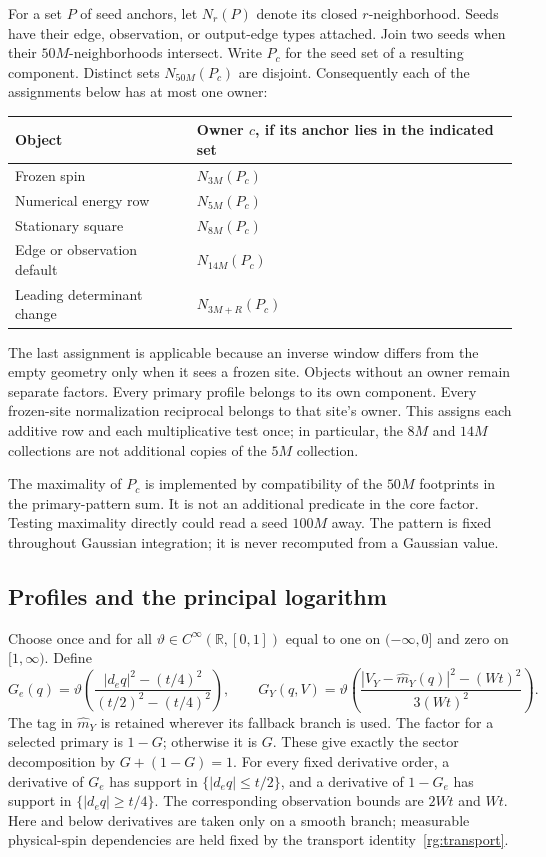 For a set $P$ of seed anchors, let $N_r(P)$ denote its closed
$r$-neighborhood.  Seeds have their edge, observation, or output-edge
types attached.  Join two seeds when their $50M$-neighborhoods intersect.
Write $P_c$ for the seed set of a resulting component.  Distinct sets
$N_{50M}(P_c)$ are disjoint.  Consequently each of the assignments below
has at most one owner:
\begin{center}
\begin{tabular}{ll}
\toprule
Object & Owner $c$, if its anchor lies in the indicated set\\
\midrule
Frozen spin & $N_{3M}(P_c)$\\
Numerical energy row & $N_{5M}(P_c)$\\
Stationary square & $N_{8M}(P_c)$\\
Edge or observation default & $N_{14M}(P_c)$\\
Leading determinant change & $N_{3M+R}(P_c)$\\
\bottomrule
\end{tabular}
\end{center}
The last assignment is applicable because an inverse window differs
from the empty geometry only when it sees a frozen site.  Objects
without an owner remain separate factors.  Every primary profile belongs
to its own component.  Every frozen-site normalization reciprocal belongs
to that site's owner.  This assigns each additive row and each
multiplicative test once; in particular, the $8M$ and $14M$ collections
are not additional copies of the $5M$ collection.

The maximality of $P_c$ is implemented by compatibility of the
$50M$ footprints in the primary-pattern sum.  It is not an additional
predicate in the core factor.  Testing maximality directly could read a
seed $100M$ away.  The pattern is fixed throughout Gaussian integration;
it is never recomputed from a Gaussian value.

\subsection{Profiles and the principal logarithm}

Choose once and for all $\vartheta\in C^\infty(\mathbb R,[0,1])$
equal to one on $(-\infty,0]$ and zero on $[1,\infty)$.  Define
\[
 G_e(q)=\vartheta\left(
 \frac{|d_eq|^2-(t/4)^2}{(t/2)^2-(t/4)^2}\right),\qquad
 G_Y(q,V)=\vartheta\left(
 \frac{|V_Y-\widehat m_Y(q)|^2-(Wt)^2}{3(Wt)^2}\right).
\]
The tag in $\widehat m_Y$ is retained wherever its fallback branch is
used.  The factor for a selected primary is $1-G$; otherwise it is $G$.
These give exactly the sector decomposition by $G+(1-G)=1$.  For every
fixed derivative order, a derivative of $G_e$ has support in
$\{|d_eq|\le t/2\}$, and a derivative of $1-G_e$ has support in
$\{|d_eq|\ge t/4\}$.  The corresponding observation bounds are $2Wt$
and $Wt$.  Here and below derivatives are taken only on a smooth branch;
measurable physical-spin dependencies are held fixed by the transport
identity~\eqref{rg:transport}.

